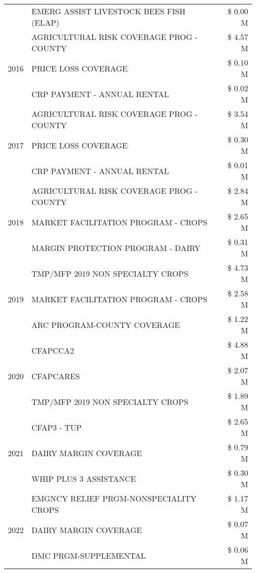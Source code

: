 \begin{tabular}{llr}
 & EMERG ASSIST LIVESTOCK BEES FISH (ELAP) & \$ 0.00 M \\
\cline{1-3}
\multirow[t]{3}{*}{2016} & AGRICULTURAL RISK COVERAGE PROG - COUNTY & \$ 4.57 M \\
 & PRICE LOSS COVERAGE & \$ 0.10 M \\
 & CRP PAYMENT - ANNUAL RENTAL & \$ 0.02 M \\
\cline{1-3}
\multirow[t]{3}{*}{2017} & AGRICULTURAL RISK COVERAGE PROG - COUNTY & \$ 3.54 M \\
 & PRICE LOSS COVERAGE & \$ 0.30 M \\
 & CRP PAYMENT - ANNUAL RENTAL & \$ 0.01 M \\
\cline{1-3}
\multirow[t]{3}{*}{2018} & AGRICULTURAL RISK COVERAGE PROG - COUNTY & \$ 2.84 M \\
 & MARKET FACILITATION PROGRAM - CROPS & \$ 2.65 M \\
 & MARGIN PROTECTION PROGRAM - DAIRY & \$ 0.31 M \\
\cline{1-3}
\multirow[t]{3}{*}{2019} & TMP/MFP 2019 NON SPECIALTY CROPS & \$ 4.73 M \\
 & MARKET FACILITATION PROGRAM - CROPS & \$ 2.58 M \\
 & ARC PROGRAM-COUNTY COVERAGE & \$ 1.22 M \\
\cline{1-3}
\multirow[t]{3}{*}{2020} & CFAPCCA2 & \$ 4.88 M \\
 & CFAPCARES & \$ 2.07 M \\
 & TMP/MFP 2019 NON SPECIALTY CROPS & \$ 1.89 M \\
\cline{1-3}
\multirow[t]{3}{*}{2021} & CFAP3 - TUP & \$ 2.65 M \\
 & DAIRY MARGIN COVERAGE & \$ 0.79 M \\
 & WHIP PLUS 3 ASSISTANCE & \$ 0.30 M \\
\cline{1-3}
\multirow[t]{3}{*}{2022} & EMGNCY RELIEF PRGM-NONSPECIALITY CROPS & \$ 1.17 M \\
 & DAIRY MARGIN COVERAGE & \$ 0.07 M \\
 & DMC PRGM-SUPPLEMENTAL & \$ 0.06 M \\
\cline{1-3}
\bottomrule
\end{tabular}

